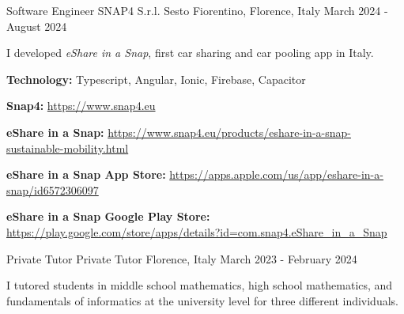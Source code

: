 

\begin{cventries}

  \cventry
    {Software Engineer} %
    {SNAP4 S.r.l.} %
    {Sesto Fiorentino, Florence, Italy} %
    {March 2024 - August 2024} %
    {
      \begin{cvitems} %
        \item {I developed \textit{eShare in a Snap}, first car sharing and car pooling app in Italy.}
        \item {\textbf{Technology:} Typescript, Angular, Ionic, Firebase, Capacitor}
        \item {\textbf{Snap4:} \href{https://www.snap4.eu/}{https://www.snap4.eu}}
        \item {\textbf{eShare in a Snap:} \href{https://www.snap4.eu/products/eshare-in-a-snap-sustainable-mobility.html}{https://www.snap4.eu/products/eshare-in-a-snap-sustainable-mobility.html}}
        \item {\textbf{eShare in a Snap App Store:} \href{https://apps.apple.com/us/app/eshare-in-a-snap/id6572306097}{https://apps.apple.com/us/app/eshare-in-a-snap/id6572306097}}
        \item {\textbf{eShare in a Snap Google Play Store:} \href{https://play.google.com/store/apps/details?id=com.snap4.eShare_in_a_Snap&hl=en}{https://play.google.com/store/apps/details?id=com.snap4.eShare\_in\_a\_Snap}}
      \end{cvitems}
    }

  \cventry
    {Private Tutor} %
    {Private Tutor} %
    {Florence, Italy} %
    {March 2023 - February 2024} %
    {
      \begin{cvitems} %
        \item {I tutored students in middle school mathematics, high school mathematics, and fundamentals of informatics at the university level for three diﬀerent individuals.}
      \end{cvitems}
    }


\end{cventries}
